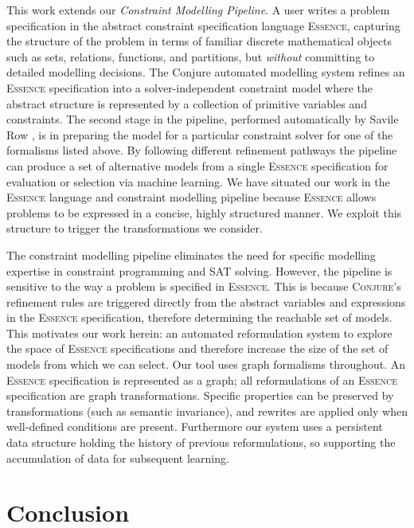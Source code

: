 \documentclass[a4paper,UKenglish,cleveref,pdfa]{lipics-v2021}
\newcommand{\essence}{\textsc{Essence}\xspace}
\newcommand{\conjure}{\textsc{Conjure}\xspace}
\begin{document}
{This work extends our {\em Constraint Modelling Pipeline}. A user writes a problem specification in the abstract constraint specification language \essence \cite{frisch2008:essence}, capturing the structure of the problem in terms of familiar discrete mathematical objects such as sets, relations, functions, and partitions, but {\em without} committing to detailed modelling decisions. The {\sc Conjure} \cite{akgun2022conjure} automated modelling system refines an \essence specification into a solver-independent constraint model where the abstract structure is represented by a collection of primitive variables and constraints. The second stage in the pipeline, performed automatically by {\sc Savile Row} \cite{savilerow}, is in preparing the model for a particular constraint solver for one of the formalisms listed above. By following different refinement pathways the pipeline can produce a set of alternative models from a single \essence specification for evaluation or selection via machine learning. We have situated our work in the \essence language and constraint modelling pipeline because \essence allows problems to be expressed in a concise, highly structured manner. We exploit this structure to trigger the transformations we consider. 

The constraint modelling pipeline eliminates the need for specific modelling expertise in constraint programming and SAT solving.
However, the pipeline is sensitive to the way a problem is specified in \essence. This is because \conjure's refinement rules are triggered directly from the abstract variables and expressions in the \essence specification, therefore determining the reachable set of models.
This motivates our work herein: an automated reformulation system to explore the space of \essence specifications and therefore increase the size of the set of models from which we can select. Our tool uses graph formalisms throughout. An \essence specification is represented as a graph; all reformulations of an \essence specification are graph transformations. Specific properties can be preserved by transformations (such as semantic invariance), and rewrites are applied only when well-defined conditions are present. Furthermore our system uses a persistent data structure holding the history of previous reformulations, so supporting the accumulation of data for subsequent learning.
}

\section{Conclusion}
\end{document}
